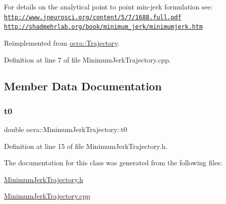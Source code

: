 For details on the analytical point to point min-\/jerk formulation see\+: \href{http://www.jneurosci.org/content/5/7/1688.full.pdf}{\tt http\+://www.\+jneurosci.\+org/content/5/7/1688.\+full.\+pdf} \href{http://shadmehrlab.org/book/minimum_jerk/minimumjerk.htm}{\tt http\+://shadmehrlab.\+org/book/minimum\+\_\+jerk/minimumjerk.\+htm}

Reimplemented from \hyperlink{classocra_1_1Trajectory_a2102a829e6dad497f7c773c346d499b7}{ocra\+::\+Trajectory}.



Definition at line 7 of file Minimum\+Jerk\+Trajectory.\+cpp.



\subsection{Member Data Documentation}
\hypertarget{classocra_1_1MinimumJerkTrajectory_a59c485dca4c2f2ed0c95809561dfff46}{}\label{classocra_1_1MinimumJerkTrajectory_a59c485dca4c2f2ed0c95809561dfff46} 
\subsubsection{\texorpdfstring{t0}{t0}}
{\footnotesize\ttfamily double ocra\+::\+Minimum\+Jerk\+Trajectory\+::t0\hspace{0.3cm}{\ttfamily [protected]}}



Definition at line 15 of file Minimum\+Jerk\+Trajectory.\+h.



The documentation for this class was generated from the following files\+:\begin{DoxyCompactItemize}
\item 
\hyperlink{MinimumJerkTrajectory_8h}{Minimum\+Jerk\+Trajectory.\+h}\item 
\hyperlink{MinimumJerkTrajectory_8cpp}{Minimum\+Jerk\+Trajectory.\+cpp}\end{DoxyCompactItemize}
